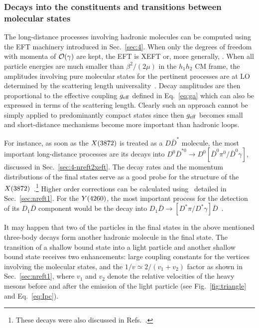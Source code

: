 \subsubsection{Decays into the constituents and transitions between molecular states}


The long-distance processes involving hadronic molecules can be computed using
the EFT machinery introduced in Sec.~\ref{sec:4}. When only
 the degrees of freedom with momenta of $\mathcal{O}\!\left(\gamma\right)\!\,$ are kept, the EFT is
XEFT or, more generally, \nreftii.
When all particle energies are much smaller than $\beta^2/(2\mu)$ in the
$h_1h_2$ CM frame, the amplitudes involving pure molecular states for the
pertinent processes  are at LO determined by the scattering length
universality~\cite{Braaten:2004rn}. Decay amplitudes are then proportional to
the effective coupling $g_{\rm eff}$ defined in Eq.~\eqref{eq:ga} which can also
be expressed in terms of the scattering length.
Clearly such an approach cannot be simply applied to predominantly compact
states since then  $g_{\rm eff}$  becomes small and short-distance mechanisms
become more important than hadronic loops.


For instance, as soon as  the $X(3872)$  is treated as a $D\bar D^*$ molecule, the
most important long-distance processes are its decays into $D^0\bar D^{*0}\to
D^0[\bar D^0\pi^0/\bar D^0\gamma]$, discussed in Sec.~\ref{sec:4-nreft2xeft}.
The decay rates and the momentum distributions of the final states serve as a
good probe for the structure of the $X(3872)$~\cite{Voloshin:2003nt}.\footnote{These
decays were also discussed in
Refs.~\cite{Swanson:2003tb,Voloshin:2005rt,Meng:2007cx, Fleming:2007rp,
Liang:2009sp, Stapleton:2009ey, Baru:2011rs,Guo:2014hqa, Polosa:2015tra}.}
Higher order corrections can be calculated using \nreft~detailed in Sec.~\ref{sec:nreft1}.
For the $Y(4260)$, the most important process for the detection of its $D_1\bar D$
component would be the decay into $D_1\bar D\to [D^*\pi/D^*\gamma]\bar
D$~\cite{Cleven:2013mka,Qin:2016spb}.

It may happen that two of the particles in the final states in the above
mentioned three-body decays form another hadronic molecule in the final state.
The transition of a shallow bound state into a light
particle and another shallow bound state receives two enhancements: large
coupling constants for the vertices involving the molecular states, and the
$1/v\simeq 2/(v_1+v_2)$ factor as shown in Sec.~\ref{sec:nreft1}, where $v_1$ and $v_2$ denote the relative velocities of the heavy mesons before
and after the emission of the light particle (see Fig.~\ref{fig:triangle} and
Eq.~\eqref{eq:Ipc}).

